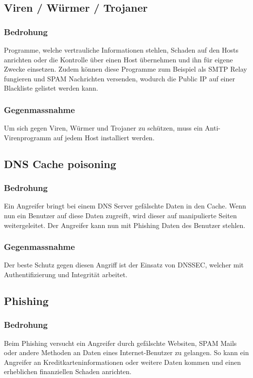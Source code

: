 \documentclass[11pt,a4paper,parskip=half]{scrartcl}
\begin{document}
\subsection{Viren / Würmer / Trojaner}
\subsubsection{Bedrohung}
Programme, welche vertrauliche Informationen stehlen, Schaden auf den Hosts anrichten oder die Kontrolle über einen Host übernehmen und ihn für eigene Zwecke einsetzen. Zudem können diese Programme zum Beispiel als SMTP Relay fungieren und SPAM Nachrichten versenden, wodurch die Public IP auf einer Blackliste gelistet werden kann.
\subsubsection{Gegenmassnahme}
Um sich gegen Viren, Würmer und Trojaner zu schützen, muss ein Anti-Virenprogramm auf jedem Host installiert werden.

\subsection{DNS Cache poisoning}
\subsubsection{Bedrohung}
Ein Angreifer bringt bei einem DNS Server gefälschte Daten in den Cache. Wenn nun ein Benutzer auf diese Daten zugreift, wird dieser auf manipulierte Seiten weitergeleitet. Der Angreifer kann nun mit Phishing Daten des Benutzer stehlen.

\subsubsection{Gegenmassnahme}
Der beste Schutz gegen diesen Angriff ist der Einsatz von DNSSEC, welcher mit Authentifizierung und Integrität arbeitet.
\subsection{Phishing}
\subsubsection{Bedrohung}
Beim Phishing versucht ein Angreifer durch gefälschte Websiten, SPAM Mails oder andere Methoden an Daten eines Internet-Benutzer zu gelangen. So kann ein Angreifer an Kreditkarteninformationen oder weitere Daten kommen und einen erheblichen finanziellen Schaden anrichten.
\end{document}

